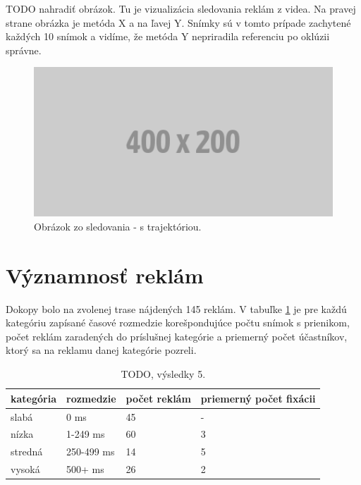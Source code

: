 TODO nahradiť obrázok. Tu je vizualizácia sledovania reklám z videa. Na pravej strane obrázka je metóda X a na ľavej Y. Snímky sú v tomto prípade zachytené každých 10 snímok a vidíme, že metóda Y nepriradila referenciu po oklúzii správne.
\begin{figure}[ht]
    \centering
    \includegraphics[width=1\textwidth]{images/placeholder.png}
    \caption{Obrázok zo sledovania - s trajektóriou.}
    \label{img:road}
\end{figure}

\section{Významnosť reklám}

Dokopy bolo na zvolenej trase nájdených 145 reklám. V tabuľke \ref{table:cat} je pre každú kategóriu zapísané časové rozmedzie korešpondujúce počtu snímok s prienikom, počet reklám zaradených do príslušnej kategórie a priemerný počet účastníkov, ktorý sa na reklamu danej kategórie pozreli.
\\
\begin{table}[ht]
\centering
\begin{tabular}{|l l l l|}
 \hline
 kategória &	rozmedzie &	počet reklám &	priemerný počet fixácii \\ [0.5ex]
 \hline
slabá &	0 ms &	45 &	- \\ [0.1ex]
nízka &	1-249 ms &	60 &	3 \\ [0.1ex]
stredná &	250-499 ms &	14 &	5 \\ [0.1ex]
vysoká &	500+ ms &	26 &	2 \\ [0.1ex]
 \hline
\end{tabular}
\caption{TODO, výsledky 5.}
\label{table:cat}
\end{table}

